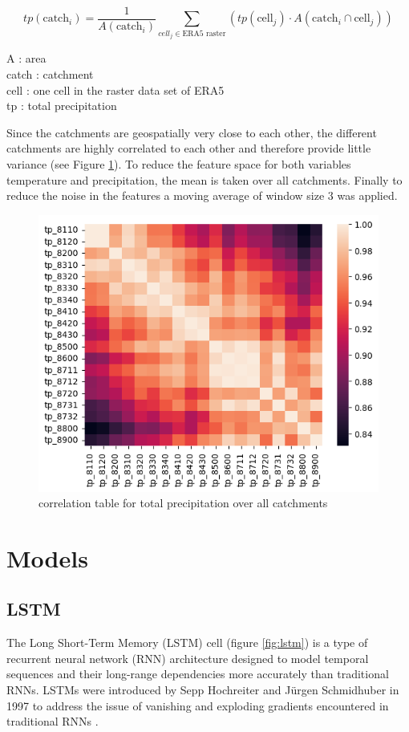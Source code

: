 \documentclass[
]{krantz}
\begin{document}
\[ tp(\text{catch}_i) = \frac{1}{A(\text{catch}_i)} \sum_{cell_j \in \text{ERA5 raster}} \left( tp(\text{cell}_j) \cdot A(\text{catch}_i \cap \text{cell}_j) \right) \tag{1} \]

A : area\\
catch : catchment\\
cell : one cell in the raster data set of ERA5\\
tp : total precipitation

Since the catchments are geospatially very close to each other, the different catchments are highly correlated to each other and therefore provide little variance (see Figure \ref{fig:tp-corr}). To reduce the feature space for both variables temperature and precipitation, the mean is taken over all catchments. Finally to reduce the noise in the features a moving average of window size 3 was applied.

\begin{figure}

{\centering \includegraphics[width=0.7\linewidth]{work/07-hydroLSTM/images/tp_correlation_table} 

}

\caption{correlation table for total precipitation over all catchments}\label{fig:tp-corr}
\end{figure}

\section{Models}\label{models}

\subsection{LSTM}\label{lstm}

The Long Short-Term Memory (LSTM) cell (figure \ref{fig:lstm}) is a type of recurrent neural network (RNN) architecture designed to model temporal sequences and their long-range dependencies more accurately than traditional RNNs. LSTMs were introduced by Sepp Hochreiter and Jürgen Schmidhuber in 1997 to address the issue of vanishing and exploding gradients encountered in traditional RNNs \citet{hochreiter}.
\end{document}
